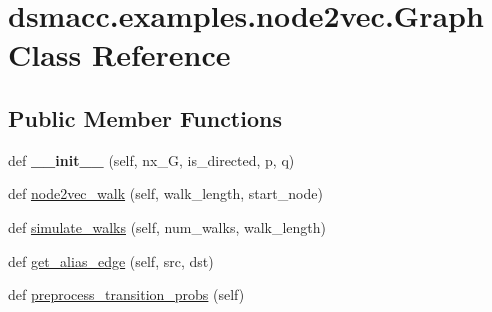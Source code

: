 \hypertarget{classdsmacc_1_1examples_1_1node2vec_1_1Graph}{}\section{dsmacc.\+examples.\+node2vec.\+Graph Class Reference}
\label{classdsmacc_1_1examples_1_1node2vec_1_1Graph}
\subsection*{Public Member Functions}
\begin{DoxyCompactItemize}
\item 
\mbox{\label{classdsmacc_1_1examples_1_1node2vec_1_1Graph_a39c59607c43f0d90e5ac615af86fa351}} 
def {\bfseries \+\_\+\+\_\+init\+\_\+\+\_\+} (self, nx\+\_\+G, is\+\_\+directed, p, q)
\item 
def \mbox{\hyperlink{classdsmacc_1_1examples_1_1node2vec_1_1Graph_ae81b905fa75b4ced46d0722cf85d90dd}{node2vec\+\_\+walk}} (self, walk\+\_\+length, start\+\_\+node)
\item 
def \mbox{\hyperlink{classdsmacc_1_1examples_1_1node2vec_1_1Graph_a71bea4409cd123157c0d7edfd2efcd36}{simulate\+\_\+walks}} (self, num\+\_\+walks, walk\+\_\+length)
\item 
def \mbox{\hyperlink{classdsmacc_1_1examples_1_1node2vec_1_1Graph_a487b5cdcbd1260ec84f0c56b49548dff}{get\+\_\+alias\+\_\+edge}} (self, src, dst)
\item 
def \mbox{\hyperlink{classdsmacc_1_1examples_1_1node2vec_1_1Graph_a8ef32284bcdfe5c25333712e2e790c55}{preprocess\+\_\+transition\+\_\+probs}} (self)
\end{DoxyCompactItemize}
